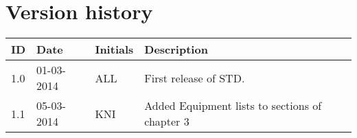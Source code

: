 \documentclass[Main]{subfiles}
\begin{document}
\section*{Version history}

\begin{tabular}{p{} p{} p{} p{}}
\hline
\textbf{ID} & \textbf{Date} & \textbf{Initials} & \textbf{Description}
\\
\hline
1.0 & 01-03-2014 & ALL & First release of STD. \\
1.1 & 05-03-2014 & KNI & Added Equipment lists to sections of chapter 3
\\ \hline 
\end{tabular} 
\end{document}
